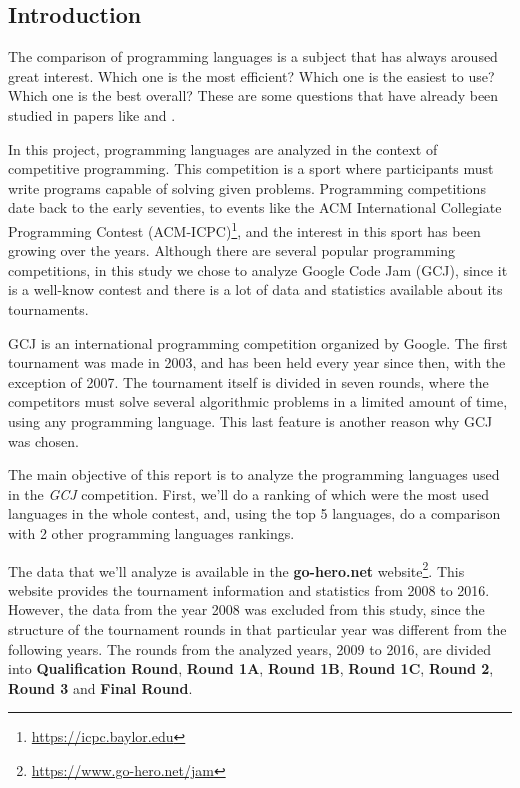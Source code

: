 \documentclass{article}
\begin{document}
\begin{multicols*}{2}


\section{Introduction}
The comparison of programming languages is a subject that has always aroused great interest. Which one is the most efficient? Which one is the easiest to use? Which one is the best overall? These are some questions that have already been studied in papers like \cite{open_source_proj} and \cite{rosetta}.


In this project, programming languages are analyzed in the context of competitive programming.
This competition is a sport where participants must write programs capable of solving given problems\cite{wiki_comp}. Programming competitions date back to the early seventies, to events like the ACM International Collegiate Programming Contest (ACM-ICPC)\footnote{\url{https://icpc.baylor.edu}}, and the interest in this sport has been growing over the years.
Although there are several popular programming competitions, in this study we chose to analyze Google Code Jam (GCJ), since it is a well-know contest and there is a lot of data and statistics available about its tournaments.

GCJ is an international programming competition\cite{gcj} organized by Google.
The first tournament was made in 2003, and has been held every year since then, with the exception of 2007. The tournament itself is divided in seven rounds, where the competitors must solve several algorithmic problems in a limited amount of time, using any programming language. This last feature is another reason why GCJ was chosen.


The main objective of this report is to analyze the programming languages used in the \textit{GCJ} competition. First, we'll do a ranking of which were the most used languages in the whole contest, and, using the top 5 languages, do a comparison with 2 other programming languages rankings.

The data that we'll analyze is available in the \textbf{go-hero.net} website\footnote{\url{https://www.go-hero.net/jam}}. This website provides the tournament information\cite{go-hero} and statistics from 2008 to 2016. However, the data from the year 2008 was excluded from this study, since the structure of the tournament rounds in that particular year was different from the following years. The rounds from the analyzed years, 2009 to 2016, are divided into \textbf{Qualification Round}, \textbf{Round 1A}, \textbf{Round 1B}, \textbf{Round 1C}, \textbf{Round 2}, \textbf{Round 3} and \textbf{Final Round}.


\end{multicols*}
\end{document}
